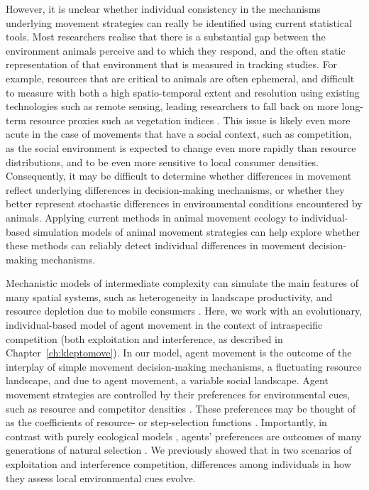     However, it is unclear whether individual consistency in the mechanisms underlying movement strategies can really be identified using current statistical tools.
    Most researchers realise that there is a substantial gap between the environment animals perceive and to which they respond, and the often static representation of that environment that is measured in tracking studies.
    For example, resources that are critical to animals are often ephemeral, and difficult to measure with both a high spatio-temporal extent and resolution using existing technologies such as remote sensing, leading researchers to fall back on more long-term resource proxies such as vegetation indices \citep{pettorelli2011}.
    This issue is likely even more acute in the case of movements that have a social context, such as competition, as the social environment is expected to change even more rapidly than resource distributions, and to be even more sensitive to local consumer densities.
    Consequently, it may be difficult to determine whether differences in movement reflect underlying differences in decision-making mechanisms, or whether they better represent stochastic differences in environmental conditions encountered by animals.
    Applying current methods in animal movement ecology to individual-based simulation models of animal movement strategies \citep[see e.g.][]{getz2015,getz2016,netz2021} can help explore whether these methods can reliably detect individual differences in movement decision-making mechanisms.
    
    Mechanistic models of intermediate complexity can simulate the main features of many spatial systems, such as heterogeneity in landscape productivity, and resource depletion due to mobile consumers \citep{getz2015,white2018,deangelis2019,netz2021,diaz2021}.
    Here, we work with an evolutionary, individual-based model of agent movement in the context of intraspecific competition (both exploitation and interference, as described in Chapter~\ref{ch:kleptomove}).
    In our model, agent movement is the outcome of the interplay of simple movement decision-making mechanisms, a fluctuating resource landscape, and due to agent movement, a variable social landscape.
    Agent movement strategies are controlled by their preferences for environmental cues, such as resource and competitor densities \citep[see e.g.][]{getz2015,white2018,netz2021}.
    These preferences may be thought of as the coefficients of resource- or step-selection functions \citep[][]{white2018}.
    Importantly, in contrast with purely ecological models \citep[e.g.][]{white2018}, agents' preferences are outcomes of many generations of natural selection \citep[see also][]{getz2015,netz2021}.
    We previously showed that in two scenarios of exploitation and interference competition, differences among individuals in how they assess local environmental cues evolve.
    

